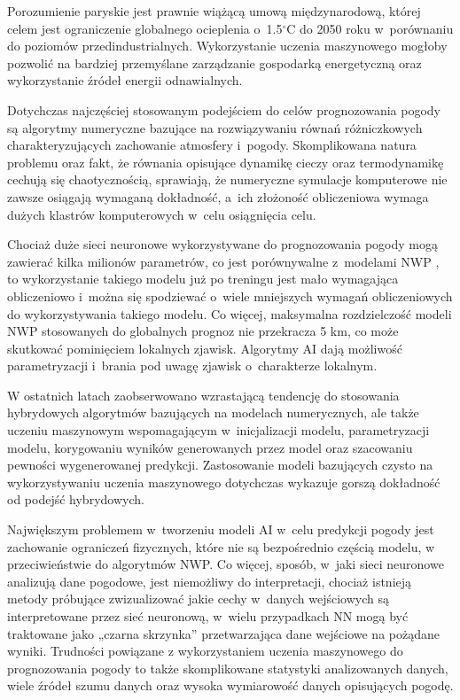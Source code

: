 Porozumienie paryskie jest prawnie wiążącą umową międzynarodową,
której celem jest ograniczenie globalnego ocieplenia o~1.5$^{\circ}$C
do 2050 roku w~porównaniu do poziomów przedindustrialnych. Wykorzystanie
uczenia maszynowego mogłoby pozwolić na bardziej przemyślane zarządzanie
gospodarką energetyczną oraz wykorzystanie źródeł energii odnawialnych.

Dotychczas najczęściej stosowanym podejściem do celów prognozowania
pogody są algorytmy numeryczne bazujące na rozwiązywaniu równań różniczkowych
charakteryzujących zachowanie atmosfery i~pogody. Skomplikowana natura
problemu oraz fakt, że równania opisujące dynamikę cieczy oraz termodynamikę
cechują się chaotycznością, sprawiają, że numeryczne symulacje komputerowe
nie zawsze osiągają wymaganą dokładność, a~ich złożoność obliczeniowa
wymaga dużych klastrów komputerowych w~celu osiągnięcia celu.

Chociaż duże sieci neuronowe wykorzystywane do prognozowania pogody
mogą zawierać kilka milionów parametrów, co jest porównywalne z~modelami
NWP \cite{can-dl-beat-numerical}, to wykorzystanie takiego modelu już po treningu
jest mało wymagająca obliczeniowo i~można się spodziewać o~wiele mniejszych wymagań
obliczeniowych do wykorzystywania takiego modelu. Co więcej, maksymalna rozdzielczość
modeli NWP stosowanych do globalnych prognoz nie przekracza 5 km, 
co może skutkować pominięciem lokalnych zjawisk. Algorytmy AI dają możliwość
parametryzacji i~brania pod uwagę zjawisk o~charakterze lokalnym.

W ostatnich latach zaobserwowano wzrastającą tendencję do stosowania hybrydowych
algorytmów bazujących na modelach numerycznych, ale także uczeniu maszynowym
wspomagającym w~inicjalizacji modelu, parametryzacji modelu, korygowaniu
wyników generowanych przez model oraz szacowaniu pewności wygenerowanej
predykcji. Zastosowanie modeli bazujących czysto na wykorzystywaniu uczenia
maszynowego dotychczas wykazuje gorszą dokładność od podejść hybrydowych.

Największym problemem w~tworzeniu modeli AI w~celu predykcji pogody jest
zachowanie ograniczeń fizycznych, które nie są bezpośrednio częścią modelu,
w przeciwieństwie do algorytmów NWP. Co więcej, sposób, w~jaki sieci neuronowe
analizują dane pogodowe, jest niemożliwy do interpretacji, chociaż istnieją
metody próbujące zwizualizować jakie cechy w~danych wejściowych są interpretowane
przez sieć neuronową, w~wielu przypadkach NN mogą być traktowane jako „czarna 
skrzynka'' przetwarzająca dane wejściowe na pożądane wyniki. Trudności powiązane
z wykorzystaniem uczenia maszynowego do prognozowania pogody to także skomplikowane
statystyki analizowanych danych, wiele źródeł szumu danych oraz wysoka wymiarowość
danych opisujących pogodę.


